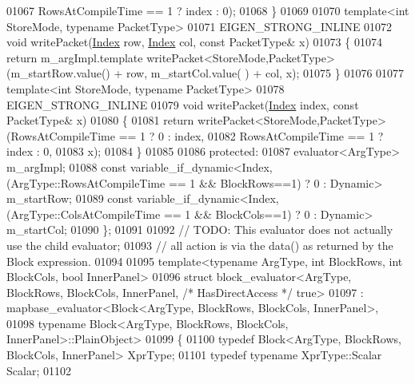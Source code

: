 \begin{DoxyCode}
01067                                        RowsAtCompileTime == 1 ? index : 0);
01068   \}
01069   
01070   \textcolor{keyword}{template}<\textcolor{keywordtype}{int} StoreMode, \textcolor{keyword}{typename} PacketType>
01071   EIGEN\_STRONG\_INLINE
01072   \textcolor{keywordtype}{void} writePacket(\hyperlink{namespace_eigen_a62e77e0933482dafde8fe197d9a2cfde}{Index} row, \hyperlink{namespace_eigen_a62e77e0933482dafde8fe197d9a2cfde}{Index} col, \textcolor{keyword}{const} PacketType& x) 
01073   \{
01074     \textcolor{keywordflow}{return} m\_argImpl.template writePacket<StoreMode,PacketType>(m\_startRow.value() + row, m\_startCol.value(
      ) + col, x); 
01075   \}
01076   
01077   \textcolor{keyword}{template}<\textcolor{keywordtype}{int} StoreMode, \textcolor{keyword}{typename} PacketType>
01078   EIGEN\_STRONG\_INLINE
01079   \textcolor{keywordtype}{void} writePacket(\hyperlink{namespace_eigen_a62e77e0933482dafde8fe197d9a2cfde}{Index} index, \textcolor{keyword}{const} PacketType& x) 
01080   \{
01081     \textcolor{keywordflow}{return} writePacket<StoreMode,PacketType>(RowsAtCompileTime == 1 ? 0 : index,
01082                                              RowsAtCompileTime == 1 ? index : 0,
01083                                              x);
01084   \}
01085  
01086 \textcolor{keyword}{protected}:
01087   evaluator<ArgType> m\_argImpl;
01088   \textcolor{keyword}{const} variable\_if\_dynamic<Index, (ArgType::RowsAtCompileTime == 1 && BlockRows==1) ? 0 : Dynamic> 
      m\_startRow;
01089   \textcolor{keyword}{const} variable\_if\_dynamic<Index, (ArgType::ColsAtCompileTime == 1 && BlockCols==1) ? 0 : Dynamic> 
      m\_startCol;
01090 \};
01091 
01092 \textcolor{comment}{// TODO: This evaluator does not actually use the child evaluator; }
01093 \textcolor{comment}{// all action is via the data() as returned by the Block expression.}
01094 
01095 \textcolor{keyword}{template}<\textcolor{keyword}{typename} ArgType, \textcolor{keywordtype}{int} BlockRows, \textcolor{keywordtype}{int} BlockCols, \textcolor{keywordtype}{bool} InnerPanel> 
01096 \textcolor{keyword}{struct }block\_evaluator<ArgType, BlockRows, BlockCols, InnerPanel, \textcolor{comment}{/* HasDirectAccess */} true>
01097   : mapbase\_evaluator<Block<ArgType, BlockRows, BlockCols, InnerPanel>,
01098                       typename Block<ArgType, BlockRows, BlockCols, InnerPanel>::PlainObject>
01099 \{
01100   \textcolor{keyword}{typedef} Block<ArgType, BlockRows, BlockCols, InnerPanel> XprType;
01101   \textcolor{keyword}{typedef} \textcolor{keyword}{typename} XprType::Scalar Scalar;
01102 

\end{DoxyCode}
